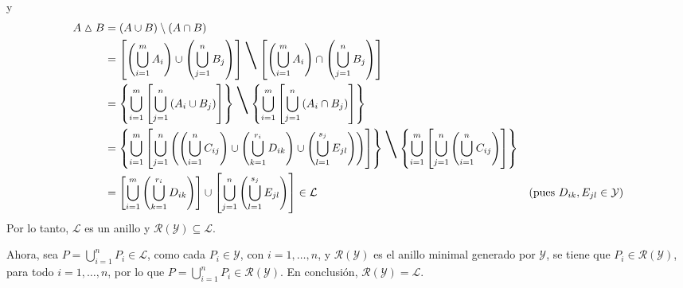 \documentclass[fleqn]{article}
\begin{document}
	y
	\begin{align*}
		A \vartriangle B &= (A \cup B) \setminus (A \cap B) \\
		&= \left[ \left( \bigcup_{i=1}^{m} A_i \right) \cup \left( \bigcup_{j=1}^{n} B_j \right) \right] \mbox{\Huge \textbackslash} \left[ \left( \bigcup_{i=1}^{m} A_i \right) \cap \left( \bigcup_{j=1}^{n} B_j \right) \right] \\
		&= \left\lbrace \bigcup_{i=1}^{m} \left[ \bigcup_{j=1}^{n} \left( A_i \cup B_j \right) \right] \right\rbrace \mbox{\Huge \textbackslash} \left\lbrace \bigcup_{i=1}^{m} \left[ \bigcup_{j=1}^{n} \left( A_i \cap B_j \right) \right] \right\rbrace \\
		&= \left\lbrace \bigcup_{i=1}^{m} \left[ \bigcup_{j=1}^{n} \left( \left( \bigcup_{i=1}^n C_{ij} \right) \cup \left( \bigcup_{k=1}^{r_i} D_{ik} \right) \cup \left( \bigcup_{l=1}^{s_j} E_{jl} \right) \right) \right] \right\rbrace \mbox{\Huge \textbackslash} \left\lbrace \bigcup_{i=1}^{m} \left[ \bigcup_{j=1}^{n} \left( \bigcup_{i=1}^n C_{ij} \right) \right] \right\rbrace \\
		&= \left[ \bigcup_{i=1}^{m} \left( \bigcup_{k=1}^{r_i} D_{ik} \right) \right] \cup \left[ \bigcup_{j=1}^{n} \left( \bigcup_{l=1}^{s_j} E_{jl} \right) \right] \in \mathcal{L} & ( \mbox{pues } D_{ik}, E_{jl} \in \mathcal{Y} )
	\end{align*}
	Por lo tanto, $ \mathcal{L} $ es un anillo y $ \mathcal{R} (\mathcal{Y}) \subseteq \mathcal{L} $.

	Ahora, sea $ P = \bigcup_{i=1}^n P_i \in \mathcal{L} $, como cada $ P_i \in \mathcal{Y} $, con $ i = 1, \ldots, n $, y $ \mathcal{R} (\mathcal{Y}) $ es el anillo minimal generado por $ \mathcal{Y} $, se tiene que $ P_i \in \mathcal{R} (\mathcal{Y}) $, para todo $ i = 1, \ldots, n $, por lo que $ P = \bigcup_{i=1}^n P_i \in \mathcal{R} (\mathcal{Y}) $. En conclusión, $ \mathcal{R} (\mathcal{Y}) = \mathcal{L} $.
\end{document}
